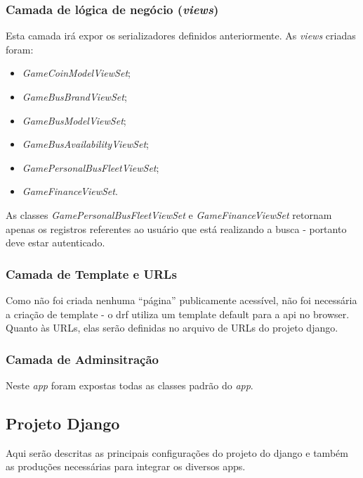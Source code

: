 \subsubsection{Camada de lógica de negócio (\textit{views})}
Esta camada irá expor os serializadores definidos anteriormente. As \textit{views} criadas foram: %
\begin{itemize}
    \item \textit{GameCoinModelViewSet};
    \item \textit{GameBusBrandViewSet};
    \item \textit{GameBusModelViewSet};
    \item \textit{GameBusAvailabilityViewSet};
    \item \textit{GamePersonalBusFleetViewSet};
    \item \textit{GameFinanceViewSet}.
\end{itemize}
As classes \textit{GamePersonalBusFleetViewSet} e \textit{GameFinanceViewSet} retornam apenas os registros referentes ao usuário que está realizando a busca - portanto deve estar autenticado.

\subsubsection{Camada de Template e URLs}
Como não foi criada nenhuma ``página'' publicamente acessível, não foi necessária a criação de template - o \gls{drf} utiliza um template default para a \gls{api} no browser. Quanto às URLs, elas serão definidas no arquivo de URLs do projeto \gls{django}.

\subsubsection{Camada de Adminsitração}
Neste \textit{app} foram expostas todas as classes padrão do \textit{app}.

\subsection{Projeto Django}
Aqui serão descritas as principais configurações do projeto do \gls{django} e também as produções necessárias para integrar os diversos apps.


